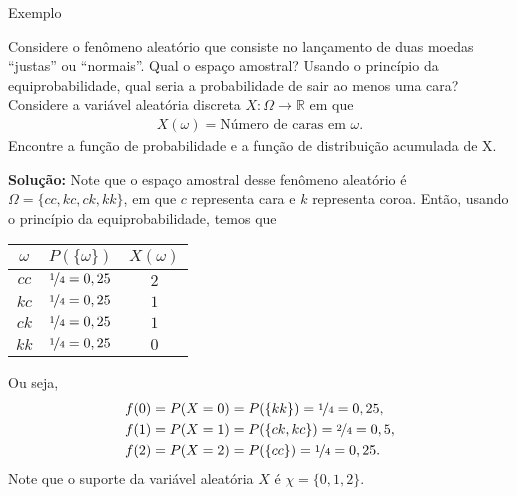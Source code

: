 \documentclass[9pt]{beamer}
\begin{document}
\begin{frame}{Exemplo}

{\scriptsize
Considere o fenômeno aleatório que consiste no lançamento de duas moedas ``justas'' ou ``normais''. Qual o espaço amostral? Usando o princípio da equiprobabilidade, qual seria a probabilidade de sair ao menos uma cara? Considere a variável aleatória discreta $X:\Omega \rightarrow \mathbb{R}$ em que 
\begin{align*}
X(\omega) = \mbox{Número de caras em } \omega.
\end{align*}
Encontre a função de probabilidade e a função de distribuição acumulada de X.
\vfill

\textbf{Solução:} Note que o espaço amostral desse fenômeno aleatório é $\Omega=\{cc,kc,ck,kk\}$, em que $c$ representa cara e $k$ representa coroa. Então, usando o princípio da equiprobabilidade, temos que
\begin{table}
 \centering
 \begin{tabular}{ccc}
  \toprule[0.05cm]
    $\omega$ & $P(\{\omega\})$ & $X(\omega)$\\ \midrule[0.05cm]
    $cc$ & $\nicefrac{1}{4} = 0,25$ & $2$\\
    $kc$ & $\nicefrac{1}{4} = 0,25$ & $1$\\
    $ck$ & $\nicefrac{1}{4} = 0,25$ & $1$\\
    $kk$ & $\nicefrac{1}{4} = 0,25$ & $0$\\
    \bottomrule[0.05cm]
 \end{tabular}
\end{table}
Ou seja, 
\begin{align*}
 f(0) &= P(X=0) = P(\{kk\})=\nicefrac{1}{4} = 0,25,\\
 f(1) &= P(X=1) = P(\{ck,kc\})=\nicefrac{2}{4} = 0,5,\\
 f(2) &= P(X=2) = P(\{cc\})=\nicefrac{1}{4} = 0,25.
\end{align*}
Note que o suporte da variável aleatória $X$ é $\chi=\{0,1,2\}$.

}

\end{frame}
\end{document}
